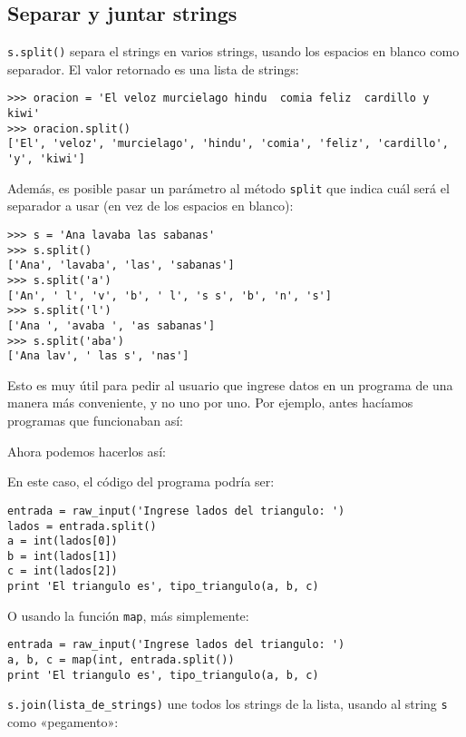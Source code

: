 \subsection{Separar y juntar strings}

\lstinline!s.split()! separa el strings en varios strings, usando los
espacios en blanco como separador. El valor retornado es una lista de
strings:

\begin{lstlisting}
>>> oracion = 'El veloz murcielago hindu  comia feliz  cardillo y kiwi'
>>> oracion.split()
['El', 'veloz', 'murcielago', 'hindu', 'comia', 'feliz', 'cardillo', 'y', 'kiwi']
\end{lstlisting}

Además, es posible pasar un parámetro al método \lstinline!split! que
indica cuál será el separador a usar (en vez de los espacios en blanco):

\begin{lstlisting}
>>> s = 'Ana lavaba las sabanas'
>>> s.split()
['Ana', 'lavaba', 'las', 'sabanas']
>>> s.split('a')
['An', ' l', 'v', 'b', ' l', 's s', 'b', 'n', 's']
>>> s.split('l')
['Ana ', 'avaba ', 'as sabanas']
>>> s.split('aba')
['Ana lav', ' las s', 'nas']
\end{lstlisting}

Esto es muy útil para pedir al usuario que ingrese datos en un programa
de una manera más conveniente, y no uno por uno. Por ejemplo, antes
hacíamos programas que funcionaban así:

Ahora podemos hacerlos así:

En este caso, el código del programa podría ser:

\begin{lstlisting}
entrada = raw_input('Ingrese lados del triangulo: ')
lados = entrada.split()
a = int(lados[0])
b = int(lados[1])
c = int(lados[2])
print 'El triangulo es', tipo_triangulo(a, b, c)
\end{lstlisting}

O usando la función \lstinline!map!, más simplemente:

\begin{lstlisting}
entrada = raw_input('Ingrese lados del triangulo: ')
a, b, c = map(int, entrada.split())
print 'El triangulo es', tipo_triangulo(a, b, c)
\end{lstlisting}

\lstinline!s.join(lista_de_strings)! une todos los strings de la lista,
usando al string \lstinline!s! como «pegamento»:

